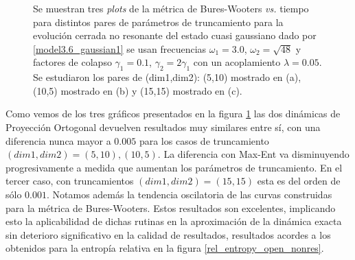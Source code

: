 \documentclass{report} %
\numberwithin{equation}{section}
\begin{document}
\begin{figure}
\caption{Se muestran tres \textit{plots} de la métrica de Bures-Wooters \textit{vs.} tiempo para distintos pares de parámetros de truncamiento para la evolución cerrada no resonante del estado cuasi gaussiano dado por \eqref{model3.6_gaussian1} se usan frecuencias $\omega_1 = 3.0$, $\omega_2 = \sqrt{48}$ y factores de colapso $\gamma_1 = 0.1$, $\gamma_2 = 2 \gamma_1$ con un acoplamiento $\lambda = 0.05$. Se estudiaron los pares de (dim1,dim2): (5,10) mostrado en (a), (10,5) mostrado en (b) y (15,15) mostrado en (c). }
\label{bxb-closed-res/bxb_open_nr.png}
\end{figure}

Como vemos de los tres gráficos presentados en la figura \ref{bxb-closed-res/bxb_open_nr.png}
las dos dinámicas de Proyección Ortogonal devuelven resultados muy similares entre sí, con una diferencia nunca mayor a $0.005$ para los casos de truncamiento $(dim1,dim2)=(5,10),(10,5)$. La diferencia con Max-Ent va disminuyendo progresivamente a medida que aumentan los parámetros de truncamiento. En el tercer caso, con truncamientos $(dim1,dim2)=(15,15)$ esta es del orden de sólo $0.001$. Notamos además la tendencia oscilatoria de las curvas construidas para la métrica de Bures-Wooters. Estos resultados son excelentes, implicando esto la aplicabilidad de dichas rutinas en la aproximación de la dinámica exacta sin deterioro significativo en la calidad de resultados, resultados acordes a los obtenidos para la entropía relativa en la figura \ref{rel_entropy_open_nonres}.
\end{document}
